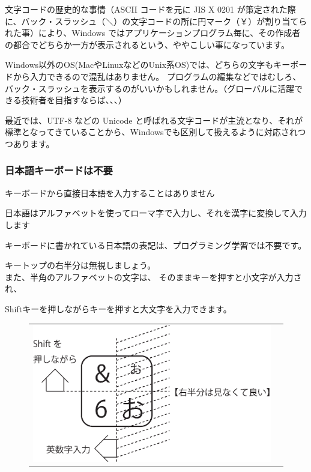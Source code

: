 \documentclass[uplatex,a4paper,11pt,oneside,openany]{jsbook}
\begin{document}
文字コードの歴史的な事情（ASCII コードを元に JIS X 0201 が策定された際に、バック・スラッシュ（＼）の文字コードの所に円マーク（￥）が割り当てられた事）により、Windows ではアプリケーションプログラム毎に、その作成者の都合でどちらか一方が表示されるという、ややこしい事になっています。

Windows以外のOS(MacやLinuxなどのUnix系OS)では、どちらの文字もキーボードから入力できるので混乱はありません。
プログラムの編集などではむしろ、バック・スラッシュを表示するのがいいかもしれません。（グローバルに活躍できる技術者を目指すならば、、、）

最近では、UTF-8 などの Unicode と呼ばれる文字コードが主流となり、それが標準となってきていることから、Windowsでも区別して扱えるように対応されつつあります。

\subsubsection{日本語キーボードは不要}

キーボードから直接日本語を入力することはありません

日本語はアルファベットを使ってローマ字で入力し、それを漢字に変換して入力します

キーボードに書かれている日本語の表記は、プログラミング学習では不要です。

キートップの右半分は無視しましょう。\\

また、半角のアルファベットの文字は、
そのままキーを押すと小文字が入力され、

Shiftキーを押しながらキーを押すと大文字を入力できます。

\begin{figure}[H]
  \centering
  \begin{tabular}{ll}
      \begin{minipage}[t]{0.9\hsize}
        \centering
  \includegraphics[scale=0.43]{figures/eps/zu2-1.eps}
      \end{minipage}
      \begin{minipage}[t]{0.1\hsize}
      \end{minipage}
    \end{tabular}
\end{figure}%
\end{document}
